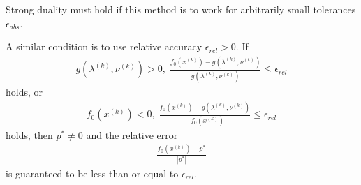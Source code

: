 Strong duality must hold if this method is to work for arbitrarily small tolerances $\epsilon_{abs}$.\par
A similar condition is to use relative accuracy $\epsilon_{rel}>0$. If
\begin{align*}
  g(\lambda^{(k)},\nu^{(k)})>0,\;\frac{f_0(x^{(k)})-g(\lambda^{(k)},\nu^{(k)})}{g(\lambda^{(k)},\nu^{(k)})}\le\epsilon_{rel}
\end{align*}
holds, or
\begin{align*}
  f_0(x^{(k)})<0,\;\frac{f_0(x^{(k)})-g(\lambda^{(k)},\nu^{(k)})}{-f_0(x^{(k)})}\le\epsilon_{rel}
\end{align*}
holds, then $p^\ast\ne 0$ and the relative error
\begin{align*}
  \frac{f_0(x^{(k)})-p^\ast}{|p^\ast|}
\end{align*}
is guaranteed to be less than or equal to $\epsilon_{rel}$.

